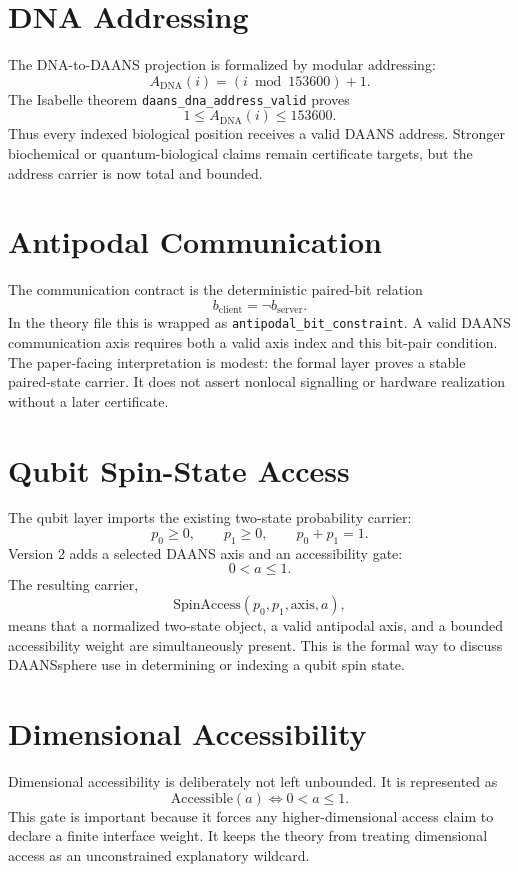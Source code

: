 \documentclass[11pt]{article}
\theoremstyle{remark}
\begin{document}
\section{DNA Addressing}

The DNA-to-DAANS projection is formalized by modular addressing:
\[
A_{\mathrm{DNA}}(i)=(i\bmod 153600)+1.
\]
The Isabelle theorem \texttt{daans\_dna\_address\_valid} proves
\[
1\leq A_{\mathrm{DNA}}(i)\leq 153600.
\]
Thus every indexed biological position receives a valid DAANS address.  Stronger biochemical or quantum-biological claims remain certificate targets, but the address carrier is now total and bounded.

\section{Antipodal Communication}

The communication contract is the deterministic paired-bit relation
\[
b_{\mathrm{client}}=\neg b_{\mathrm{server}}.
\]
In the theory file this is wrapped as \texttt{antipodal\_bit\_constraint}.  A valid DAANS communication axis requires both a valid axis index and this bit-pair condition.  The paper-facing interpretation is modest: the formal layer proves a stable paired-state carrier.  It does not assert nonlocal signalling or hardware realization without a later certificate.

\section{Qubit Spin-State Access}

The qubit layer imports the existing two-state probability carrier:
\[
p_0\geq 0,\qquad p_1\geq 0,\qquad p_0+p_1=1.
\]
Version 2 adds a selected DAANS axis and an accessibility gate:
\[
0<a\leq 1.
\]
The resulting carrier,
\[
\mathrm{SpinAccess}(p_0,p_1,\mathrm{axis},a),
\]
means that a normalized two-state object, a valid antipodal axis, and a bounded accessibility weight are simultaneously present.  This is the formal way to discuss DAANSsphere use in determining or indexing a qubit spin state.

\section{Dimensional Accessibility}

Dimensional accessibility is deliberately not left unbounded.  It is represented as
\[
\mathrm{Accessible}(a)\iff 0<a\leq 1.
\]
This gate is important because it forces any higher-dimensional access claim to declare a finite interface weight.  It keeps the theory from treating dimensional access as an unconstrained explanatory wildcard.
\end{document}
